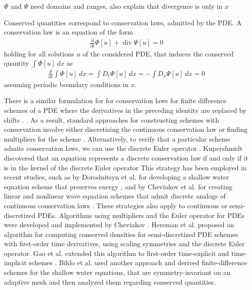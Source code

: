 \documentclass[runningheads]{llncs}
\renewcommand{\div}{\operatorname{div}}
\newcommand{\1}{\chi}
\begin{document}
{\color{red} $\Phi$ and $\Psi$ need domains and ranges, also explain that divergence is only in $x$}

Conserved quantities correspond to conservation laws, admitted by the PDE. A conservation law \cite{cheviakov20} is an equation of the form
\begin{gather*}
	\frac{\partial }{\partial t}\Phi[u]+\div \Psi[u]=0
\end{gather*}
holding for all solutions $u$ of the considered PDE,
that induces the conserved quantity $\int \Phi[u]\ dx$ as
\begin{gather*}
	\frac{d}{dt}\int \Phi[u]\ dx=\int D_t\Phi[u]\ dx=-\int D_x\Psi[u]\ dx=0
\end{gather*}
assuming periodic boundary conditions in $x$.

There is a similar formulation for
for conservation laws for finite difference schemes of a PDE  where the derivatives in the preceding identity are replaced by shifts \cite{hydon01}.  . As a result, standard approaches for constructing schemes with conservation involve either discretizing the continuous conservation law or finding multipliers for the scheme \cite{dorodnitsyn21}.
Alternatively, 
to verify that a particular scheme admits conservation laws, we can use the  discrete Euler operator \cite{cheviakov20}. Kupershmidt \cite[II. Theorem 31]{kupershmidt85} discovered that an equation represents a discrete conservation law if and only if it is in the kernel of the discrete Euler operator
This strategy has been employed in recent studies, such as by Dorodnitsyn et al. for developing a shallow water equation scheme that preserves energy \cite{dorodnitsyn21}, and by Cheviakov et al. for creating linear and nonlinear wave equation schemes that admit discrete analogs of continuous conservation laws \cite{cheviakov20}.
These strategies also apply to continuous or semi-discretized PDEs. Algorithms using multipliers and the Euler operator for PDEs were developed and implemented by Cheviakov \cite{cheviakov07,cheviakov10}. Hereman et al. \cite{hereman04,hereman08} proposed an algorithm for computing conserved densities for semi-discretized PDE schemes with first-order time derivatives, using scaling symmetries and the discrete Euler operator. Gao et al. extended this algorithm to first-order time-explicit \cite{gao02} and time-implicit schemes \cite{gao04}.
Bihlo et al. \cite{bihlo12} used another approach and derived finite-difference schemes for the shallow water equations, that are symmetry-invariant on an adaptive mesh and then analyzed them regarding conserved quantities.
\end{document}
